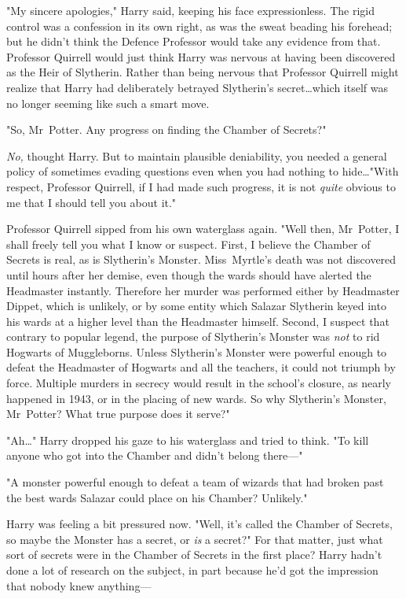 "My sincere apologies," Harry said, keeping his face expressionless. The rigid
control was a confession in its own right, as was the sweat beading his
forehead; but he didn't think the Defence Professor would take any evidence
from that. Professor Quirrell would just think Harry was nervous at having been
discovered as the Heir of Slytherin. Rather than being nervous that Professor
Quirrell might realize that Harry had deliberately betrayed Slytherin's
secret…which itself was no longer seeming like such a smart move.

"So, Mr~Potter. Any progress on finding the Chamber of Secrets?"

\emph{No,} thought Harry. But to maintain plausible deniability, you needed a
general policy of sometimes evading questions even when you had nothing to
hide…"With respect, Professor Quirrell, if I had made such progress, it
is not \emph{quite} obvious to me that I should tell you about it."

Professor Quirrell sipped from his own waterglass again. "Well then,
Mr~Potter, I shall freely tell you what I know or suspect. First, I believe
the Chamber of Secrets is real, as is Slytherin's Monster. Miss~Myrtle's death
was not discovered until hours after her demise, even though the wards should
have alerted the Headmaster instantly. Therefore her murder was performed
either by Headmaster Dippet, which is unlikely, or by some entity which Salazar
Slytherin keyed into his wards at a higher level than the Headmaster himself.
Second, I suspect that contrary to popular legend, the purpose of Slytherin's
Monster was \emph{not} to rid Hogwarts of Muggleborns. Unless Slytherin's
Monster were powerful enough to defeat the Headmaster of Hogwarts and all the
teachers, it could not triumph by force. Multiple murders in secrecy would
result in the school's closure, as nearly happened in 1943, or in the placing
of new wards. So why Slytherin's Monster, Mr~Potter? What true purpose does it
serve?"

"Ah…" Harry dropped his gaze to his waterglass and tried to think. "To
kill anyone who got into the Chamber and didn't belong there—"

"A monster powerful enough to defeat a team of wizards that had broken past the
best wards Salazar could place on his Chamber? Unlikely."

Harry was feeling a bit pressured now. "Well, it's called the Chamber of
Secrets, so maybe the Monster has a secret, or \emph{is} a secret?" For that
matter, just what sort of secrets were in the Chamber of Secrets in the first
place? Harry hadn't done a lot of research on the subject, in part because he'd
got the impression that nobody knew anything—


